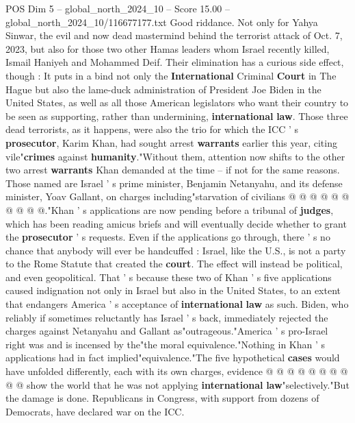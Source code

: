 \begin{textsample}{POS Dim 5 – global\_north\_2024\_10 – Score 15.00 – global\_north\_2024\_10/116677177.txt}  \label{ex:f5_pos_402}
Good riddance.
Not only for Yahya Sinwar, the evil and now dead mastermind behind the terrorist attack of Oct. 7, 2023, but also for those two other Hamas leaders whom Israel recently killed, Ismail Haniyeh and Mohammed Deif.
Their elimination has a curious side effect, though : It puts in a bind not only the \textbf{International} Criminal \textbf{Court} in The Hague but also the lame-duck administration of President Joe Biden in the United States, as well as all those American legislators who want their country to be seen as supporting, rather than undermining, \textbf{international} \textbf{law}.
Those three dead terrorists, as it happens, were also the trio for which the ICC ' s \textbf{prosecutor}, Karim Khan, had sought arrest \textbf{warrants} earlier this year, citing vile"\textbf{crimes} against \textbf{humanity}."Without them, attention now shifts to the other two arrest \textbf{warrants} Khan demanded at the time -- if not for the same reasons.
Those named are Israel ' s prime minister, Benjamin Netanyahu, and its defense minister, Yoav Gallant, on charges including"starvation of civilians @ @ @ @ @ @ @ @ @ @."Khan ' s applications are now pending before a tribunal of \textbf{judges}, which has been reading amicus briefs and will eventually decide whether to grant the \textbf{prosecutor} ' s requests.
Even if the applications go through, there ' s no chance that anybody will ever be handcuffed : Israel, like the U.S., is not a party to the Rome Statute that created the \textbf{court}.
The effect will instead be political, and even geopolitical.
That ' s because these two of Khan ' s five applications caused indignation not only in Israel but also in the United States, to an extent that endangers America ' s acceptance of \textbf{international} \textbf{law} as such.
Biden, who reliably if sometimes reluctantly has Israel ' s back, immediately rejected the charges against Netanyahu and Gallant as"outrageous."America ' s pro-Israel right was and is incensed by the"the moral equivalence."Nothing in Khan ' s applications had in fact implied"equivalence."The five hypothetical \textbf{cases} would have unfolded differently, each with its own charges, evidence @ @ @ @ @ @ @ @ @ @ show the world that he was not applying \textbf{international} \textbf{law}"selectively."But the damage is done.
Republicans in Congress, with support from dozens of Democrats, have declared war on the ICC.

\end{textsample}
